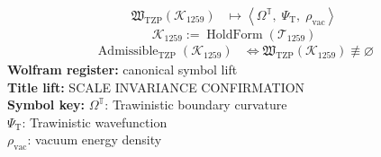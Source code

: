 \noindent
\begin{minipage}[t]{0.48\linewidth}
\begingroup
\small
\[
\begin{aligned}
\mathfrak{W}_{\mathrm{TZP}}\!\left(\mathcal{K}_{1259}\right)
&\longmapsto
\left\langle \Omega^{\mathbb{T}},\; \Psi_{\mathrm{T}},\; \rho_{\mathrm{vac}} \right\rangle
\end{aligned}
\]
\[
\mathcal{K}_{1259}
:=
\operatorname{HoldForm}\!\left(\mathcal{T}_{1259}\right)
\]
\[
\begin{aligned}
\operatorname{Admissible}_{\mathrm{TZP}}\!\left(\mathcal{K}_{1259}\right)
&\Longleftrightarrow
\mathfrak{W}_{\mathrm{TZP}}\!\left(\mathcal{K}_{1259}\right)\not\equiv\varnothing
\end{aligned}
\]
\textbf{Wolfram register:} canonical symbol lift\\
\textbf{Title lift:} SCALE INVARIANCE CONFIRMATION\\
\textbf{Symbol key:} \(\Omega^{\mathbb{T}}\): Trawinistic boundary curvature\\ \(\Psi_{\mathrm{T}}\): Trawinistic wavefunction\\ \(\rho_{\mathrm{vac}}\): vacuum energy density
\par
\endgroup
\end{minipage}\hfill
